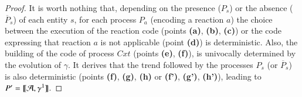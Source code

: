 \begin{proof}
 
It is worth nothing that, depending on the presence ($P_s$) or the absence ($\overline{P}_s$) of each entity $s$, for each process $P_a$ (encoding a reaction $a$) the choice between the execution of the reaction code (points {\bf (a)}, {\bf (b)}, {\bf (c)}) or  the code expressing that reaction $a$ is not applicable (point {\bf (d)}) is deterministic.
Also, the building of the code of process $\mathit{Cxt}$ (points {\bf (e)}, {\bf (f)}), is univocally determined by the evolution of $\gamma$.
It derives that the trend followed by the processes $P_s$ (or $\overline{P}_s$) is also deterministic (points {\bf (f)}, {\bf (g)}, {\bf (h)} or {\bf (f')}, {\bf (g')}, {\bf (h')}), leading to $P' = \llbracket {\cal A},\gamma^1\rrbracket$.
 \end{proof}
 
%
 
